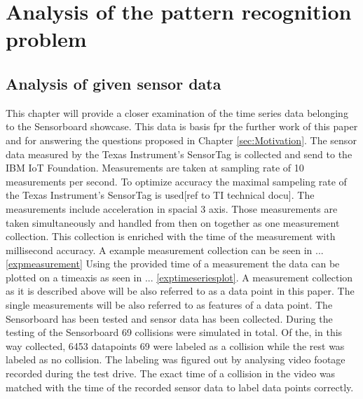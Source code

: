 \chapter{Analysis of the pattern recognition problem}
\label{ch:Analysis of the pattern recognition problem}

\section{Analysis of given sensor data}
\label{sec:Analysis of the time series data}
This chapter will provide a closer examination of the time series data belonging to the Sensorboard showcase. This data is basis fpr the further work of this paper and for answering the questions proposed in Chapter \ref{sec:Motivation}. \newline
The sensor data measured by the Texas Instrument's SensorTag is collected and send to the IBM IoT Foundation. Measurements are taken at sampling rate of 10 measurements per second. To optimize accuracy the maximal sampeling rate of the Texas Instrument's SensorTag is used[ref to TI technical docu].  The measurements include acceleration in spacial 3 axis. Those measurements are taken  simultaneously and handled from then on together as one measurement collection. This collection is enriched with the time of the measurement  with millisecond accuracy. A example measurement collection can be seen in ... \ref{expmeasurement} Using the provided time of a measurement the data can be plotted on a timeaxis as seen in ... \ref{exptimeseriesplot}.
A measurement collection as it is described above will be also referred to as a data point in this paper. The single measurements will be also referred to as features of a data point.\newline
The Sensorboard has been tested and sensor data has been collected. During the testing of the Sensorboard 69 collisions were simulated in total. Of the, in this way collected, 6453 datapoints 69 were labeled as a collision while the rest was labeled  as no collision. The labeling was figured out by analysing video footage recorded during the test drive. The exact time of a collision in the video was matched with the time of the recorded sensor data to label data points correctly.

